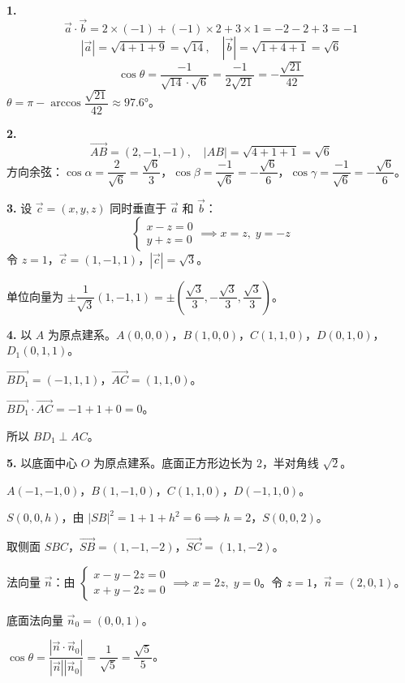 \documentclass[12pt, a4paper]{ctexart}
\begin{document}
\begin{knowledgebox}[参考答案]

\textbf{1.}
\[
\vec{a}\cdot\vec{b}=2\times(-1)+(-1)\times2+3\times1=-2-2+3=-1
\]
\[
|\vec{a}|=\sqrt{4+1+9}=\sqrt{14},\quad|\vec{b}|=\sqrt{1+4+1}=\sqrt{6}
\]
\[
\cos\theta=\frac{-1}{\sqrt{14}\cdot\sqrt{6}}=\frac{-1}{2\sqrt{21}}=-\frac{\sqrt{21}}{42}
\]
$\theta=\pi-\arccos\dfrac{\sqrt{21}}{42}\approx 97.6°$。

\bigskip
\textbf{2.}
\[
\overrightarrow{AB}=(2,-1,-1),\quad|AB|=\sqrt{4+1+1}=\sqrt{6}
\]
方向余弦：$\cos\alpha=\dfrac{2}{\sqrt{6}}=\dfrac{\sqrt{6}}{3}$，$\cos\beta=\dfrac{-1}{\sqrt{6}}=-\dfrac{\sqrt{6}}{6}$，$\cos\gamma=\dfrac{-1}{\sqrt{6}}=-\dfrac{\sqrt{6}}{6}$。

\bigskip
\textbf{3.}
设 $\vec{c}=(x,y,z)$ 同时垂直于 $\vec{a}$ 和 $\vec{b}$：
\[
\begin{cases}x-z=0\\y+z=0\end{cases}\implies x=z,\;y=-z
\]
令 $z=1$，$\vec{c}=(1,-1,1)$，$|\vec{c}|=\sqrt{3}$。

单位向量为 $\pm\dfrac{1}{\sqrt{3}}(1,-1,1)=\pm\!\left(\dfrac{\sqrt{3}}{3},-\dfrac{\sqrt{3}}{3},\dfrac{\sqrt{3}}{3}\right)$。

\bigskip
\textbf{4.}
以 $A$ 为原点建系。$A(0,0,0)$，$B(1,0,0)$，$C(1,1,0)$，$D(0,1,0)$，$D_1(0,1,1)$。

$\overrightarrow{BD_1}=(-1,1,1)$，$\overrightarrow{AC}=(1,1,0)$。

$\overrightarrow{BD_1}\cdot\overrightarrow{AC}=-1+1+0=0$。

所以 $BD_1\perp AC$。

\bigskip
\textbf{5.}
以底面中心 $O$ 为原点建系。底面正方形边长为 $2$，半对角线 $\sqrt{2}$。

$A(-1,-1,0)$，$B(1,-1,0)$，$C(1,1,0)$，$D(-1,1,0)$。

$S(0,0,h)$，由 $|SB|^2=1+1+h^2=6\implies h=2$，$S(0,0,2)$。

取侧面 $SBC$，$\overrightarrow{SB}=(1,-1,-2)$，$\overrightarrow{SC}=(1,1,-2)$。

法向量 $\vec{n}$：由 $\begin{cases}x-y-2z=0\\x+y-2z=0\end{cases}\implies x=2z,\;y=0$。令 $z=1$，$\vec{n}=(2,0,1)$。

底面法向量 $\vec{n}_0=(0,0,1)$。

$\cos\theta=\dfrac{|\vec{n}\cdot\vec{n}_0|}{|\vec{n}||\vec{n}_0|}=\dfrac{1}{\sqrt{5}}=\dfrac{\sqrt{5}}{5}$。


\end{knowledgebox}
\end{document}
